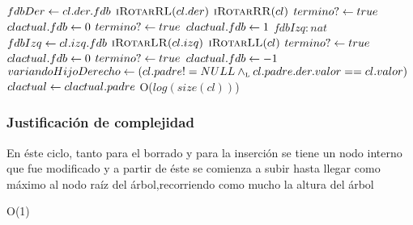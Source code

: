 {					\State {} 
					\State {}
						\State $fdbDer \leftarrow cl.der.fdb$ 
					\EndIf
					\State {} 
						\State ${\text{\normalfont\textsc{iRotarRL}}(cl.der)}$ 
					\EndIf
					\State ${\text{\normalfont\textsc{iRotarRR}}(cl)}$ 
					\State $termino? \leftarrow true$ \
				\Else
					\State {} 
						\State $clactual.fdb \leftarrow 0$ 
						\State $termino? \leftarrow true$ 
					\Else
						\State $clactual.fdb \leftarrow 1$ 
					\EndIf
				\EndIf
			\Else
				\State {} 
					\State $fdbIzq:nat$ 
					\State {}
						\State $fdbIzq \leftarrow cl.izq.fdb$ 
					\EndIf
					\State {} 
						\State ${\text{\normalfont\textsc{iRotarLR}}(cl.izq)}$ 
					\EndIf
					\State ${\text{\normalfont\textsc{iRotarLL}}(cl)}$ 
					\State $termino? \leftarrow true$ 
				\Else
					\State {} 
						\State $clactual.fdb \leftarrow 0$ 
						\State $termino? \leftarrow true$ 
					\Else
						\State $clactual.fdb \leftarrow -1$ 
					\EndIf
				\EndIf
			\EndIf
			\State $variandoHijoDerecho \leftarrow (cl.padre != NULL \land_{\mathrm{\scriptscriptstyle{L}}} cl.padre.der.valor == cl.valor)$ 
			\State $clactual \leftarrow clactual.padre$ \complejidad{$O(1)$}
		\EndWhile
	\EndIf
}
{O($log(size(cl))$)}

\subsubsection*{Justificación de complejidad}{
	En éste ciclo, tanto para el borrado y para la inserción se tiene un nodo interno que fue modificado y a partir de éste se 
	comienza a subir hasta llegar como máximo al nodo raíz del árbol,recorriendo como mucho la altura del árbol
}

{O(1)}

